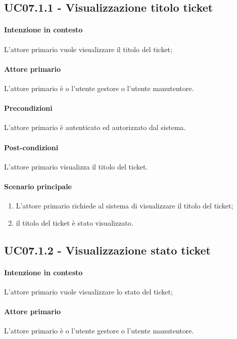 \subsection{UC07.1.1 - Visualizzazione titolo ticket}\label{uc:07.1.1}

\paragraph{Intenzione in contesto} L'attore primario vuole visualizzare il titolo del ticket;
\paragraph{Attore primario} L'attore primario è o l'utente gestore o l'utente manutentore.
\paragraph{Precondizioni}  L'attore primario è autenticato ed autorizzato dal sistema.
\paragraph{Post-condizioni} L'attore primario visualizza il titolo del ticket.
\paragraph{Scenario principale}
\begin{enumerate}
    \item L'attore primario richiede al sistema di visualizzare il titolo del ticket;
    \item il titolo del ticket è stato visualizzato.
\end{enumerate}

\subsection{UC07.1.2 - Visualizzazione stato ticket}\label{uc:07.1.2}

\paragraph{Intenzione in contesto} L'attore primario vuole visualizzare lo stato del ticket;
\paragraph{Attore primario} L'attore primario è o l'utente gestore o l'utente manutentore.
